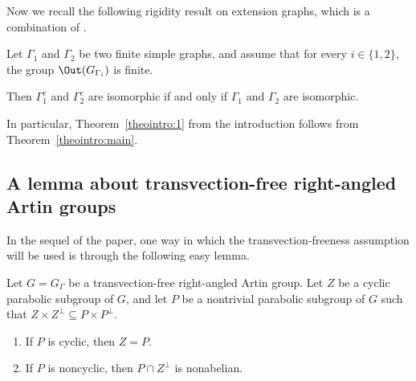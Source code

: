 Now we recall the following rigidity result on extension graphs, which is a combination of \cite[Cor.\,4.16 and Lemma 4.17]{Hua}.

\begin{theo}\label{theo:rigidity}
Let $\Gamma_1$ and $\Gamma_2$ be two finite simple graphs, and assume that for every $i\in\{1,2\}$, the group $\Out(G_{\Gamma_i})$ is finite.

Then $\Gamma_1^e$ and $\Gamma_2^e$ are isomorphic if and only if $\Gamma_1$ and $\Gamma_2$ are isomorphic.
\end{theo}

In particular, Theorem~\ref{theointro:1} from the introduction follows from Theorem~\ref{theointro:main}.

\subsection{A lemma about transvection-free right-angled Artin groups}\label{sec:transvection-free}

In the sequel of the paper, one way in which the transvection-freeness assumption will be used is through the following easy lemma.

\begin{lemma}\label{lemma:transvection-free}
Let $G=G_\Gamma$ be a transvection-free right-angled Artin group. Let $Z$ be a cyclic parabolic subgroup of $G$, and let $P$ be a nontrivial parabolic subgroup of $G$ such that $Z\times Z^{\perp}\subseteq P\times P^{\perp}$.
\begin{enumerate}
\item If $P$ is cyclic, then $Z=P$.
\item If $P$ is noncyclic, then $P\cap Z^{\perp}$ is nonabelian.
\end{enumerate}
\end{lemma}

